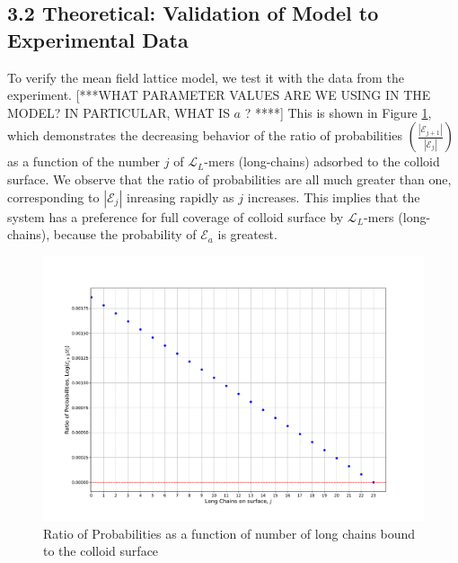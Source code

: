 \documentclass[journal=mamobx,manuscript=article]{achemso}
\newcommand{\leng}{\mathcal{L}}
\begin{document}
\subsection{3.2  Theoretical:
Validation of Model to Experimental Data}    %
    \label{sec-res-theor}

To verify the mean field lattice model, we test it with the data from the experiment. [***WHAT PARAMETER VALUES ARE WE USING
IN THE MODEL?  IN PARTICULAR, WHAT IS $a$ ? ****]
This is shown in Figure \ref{figure 11}, which demonstrates the decreasing behavior of the ratio of probabilities 
$\left(\frac{|\mathcal{E}_{j+1}|}{|\mathcal{E}_j|}\right)$ as a function of the number $j$ of $\leng_L$-mers (long-chains) adsorbed to the colloid surface. We observe that the ratio of probabilities %
are all much
greater than one, corresponding to $|\mathcal{E}_j|$ 
inreasing rapidly as $j$ increases.
This implies that the system has a preference for full coverage of colloid surface by $\leng_L$-mers (long-chains), because the probability of $\mathcal{E}_a$ is greatest.


\begin{figure}[H]
\centering
\includegraphics[scale=0.45]{Figure_LONGSHORT.pdf}
\caption{Ratio of Probabilities as a function of number of long chains bound to the colloid surface}
\label{figure 11}
\end{figure}
\end{document}
